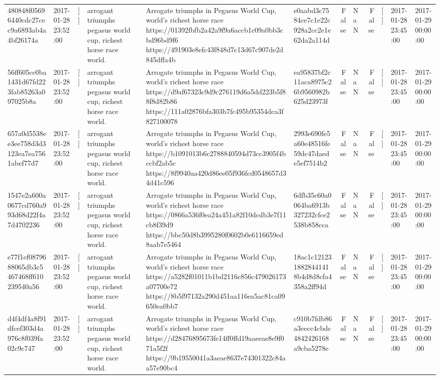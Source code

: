 \begin{tabular}{llllllrlrlll}
480848f05696440cdc27cec9a6893ab4a4bf26174a & 2017-01-28 23:52:00 & [] & arrogant triumphs pegasus world cup, richest horse race world. & Arrogate triumphs in Pegasus World Cup, world's richest horse race https://01392fbfb2a42a9f9a6accb1c09a0bb3cbd96bd9f6 https://491903e8efc43f848d7c13d67c907de2d845dffa4b & e0aabd3c7584ce7c1e22c928a2cc2e1e62da2a114d & False & NaN & False & [] & 2017-01-28 23:45:00 & 2017-01-29 00:00:00 \\
56ff605cc0ba1431d67fd223fab85263a097025b8a & 2017-01-28 23:52:00 & [] & arrogant triumphs pegasus world cup, richest horse race world. & Arrogate triumphs in Pegasus World Cup, world's richest horse race https://d9af67323c9d9c276119d6a5dd223b5f88f8d82b86 https://111a02876bfa303b7fc495b95354dca3f827100078 & ea95837bf2c11aca8975c26b9560982b625d23973f & False & NaN & False & [] & 2017-01-28 23:45:00 & 2017-01-29 00:00:00 \\
657a0d5538ee3ee758d3d3123ea7ea7561abef77d7 & 2017-01-28 23:52:00 & [] & arrogant triumphs pegasus world cup, richest horse race world. & Arrogate triumphs in Pegasus World Cup, world's richest horse race https://b1091013b6c2788840594d73cc3905f4bccbf2ab5c https://8f9940aa420d86ee05f936fcd0548657d34d41c596 & 2993e690fe5a60e48516fe59dc47daede5ef7514b2 & False & NaN & False & [] & 2017-01-28 23:45:00 & 2017-01-29 00:00:00 \\
1547e2a600a0677cd760a993d68d22f4a7d4702236 & 2017-01-28 23:52:00 & [] & arrogant triumphs pegasus world cup, richest horse race world. & Arrogate triumphs in Pegasus World Cup, world's richest horse race https://0866a536f0ea24a451a82f10dcdb3e7f11cb8f39d9 https://bbc50d8b3995280f0602b0e6116659ed8aab7e5464 & 6dfb35c60a0064ba6913b327232cfce2538b858cca & False & NaN & False & [] & 2017-01-28 23:45:00 & 2017-01-29 00:00:00 \\
e77f1ef0879688065db3c5467468ff610239540a56 & 2017-01-28 23:52:00 & [] & arrogant triumphs pegasus world cup, richest horse race world. & Arrogate triumphs in Pegasus World Cup, world's richest horse race https://a5282f01011b1bd2116c856c479026173a07700e72 https://8b5f97132a290d451aa116ea5ac81ca09650ea0bb7 & 18ac1c1212318828441418b4d8d8cfa4358a2ff94d & False & NaN & False & [] & 2017-01-28 23:45:00 & 2017-01-29 00:00:00 \\
d4f4df4a8f91dfcef303d4a976c8f039fa02c9c747 & 2017-01-28 23:52:00 & [] & arrogant triumphs pegasus world cup, richest horse race world. & Arrogate triumphs in Pegasus World Cup, world's richest horse race https://d28476895673fe14ff0ffd19aaeeae8e9f071a5f2f https://9b19550041a3aeae8637e74301322c84aa57e90bc4 & c910b7fdb86a3eecc4cbdc4842426168a9cba5278e & False & NaN & False & [] & 2017-01-28 23:45:00 & 2017-01-29 00:00:00 \\

\end{tabular}
